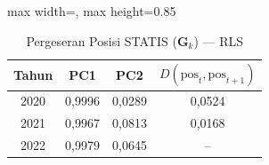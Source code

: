 \begin{table}[H]
\centering
\caption{Pergeseran Posisi STATIS ($\mathbf{G}_k$) --- RLS} \label{tab:sample1jarak_statis_loading_rls}
\begin{adjustbox}{max width=\textwidth, max height=0.85\textheight}
\begin{tabular}{|c|c|c|c|}
\hline
\textbf{Tahun} & \textbf{PC1} & \textbf{PC2} & \textbf{$D(\text{pos}_t, \text{pos}_{t+1})$} \\
\hline
2020 & 0,9996 & 0,0289 & 0,0524 \\
2021 & 0,9967 & 0,0813 & 0,0168 \\
2022 & 0,9979 & 0,0645 & -- \\
\hline
\end{tabular}
\end{adjustbox}
\end{table}